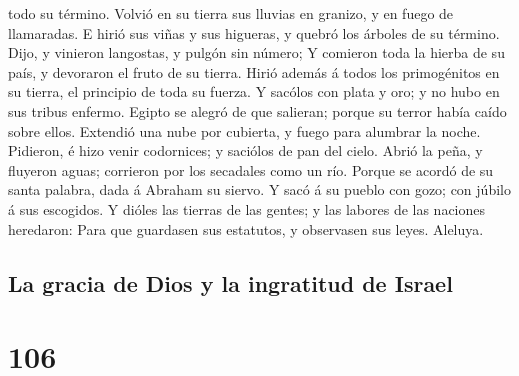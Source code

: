 todo su término.  Volvió en su tierra sus lluvias en
granizo, y en fuego de llamaradas.  E hirió sus viñas y
sus higueras, y quebró los árboles de su término.  Dijo,
y vinieron langostas, y pulgón sin número;  Y comieron
toda la hierba de su país, y devoraron el fruto de su tierra.
 Hirió además á todos los primogénitos en su tierra, el
principio de toda su fuerza.  Y sacólos con plata y oro;
y no hubo en sus tribus enfermo.  Egipto se alegró de que
salieran; porque su terror había caído sobre ellos. 
Extendió una nube por cubierta, y fuego para alumbrar la noche.
 Pidieron, é hizo venir codornices; y saciólos de pan del
cielo.  Abrió la peña, y fluyeron aguas; corrieron por
los secadales como un río.  Porque se acordó de su santa
palabra, dada á Abraham su siervo.  Y sacó á su pueblo
con gozo; con júbilo á sus escogidos.  Y dióles las
tierras de las gentes; y las labores de las naciones heredaron:
 Para que guardasen sus estatutos, y observasen sus
leyes. Aleluya.

\hypertarget{la-gracia-de-dios-y-la-ingratitud-de-israel}{%
\subsection{La gracia de Dios y la ingratitud de
Israel}\label{la-gracia-de-dios-y-la-ingratitud-de-israel}}

\hypertarget{section-105}{%
\section{106}\label{section-105}}

